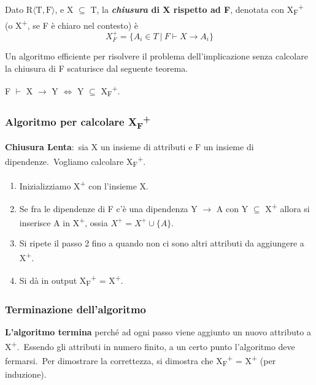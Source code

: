 \begin{definition}
	Dato $\mathrm{R\langle T,F \rangle}$, e X $\subseteq$ T, la \textbf{\textit{chiusura} di X rispetto ad F}, denotata con X\textsubscript{F}\textsuperscript{+} (o X\textsuperscript{+}, se F è chiaro nel contesto) è
	\[
		X_F^+ = \{A_i \in T\ |\ F \vdash X \rightarrow A_i\}
	\]
\end{definition}

\noindent Un algoritmo efficiente per risolvere il problema dell'implicazione senza calcolare la chiusura di F scaturisce dal seguente teorema.\

\begin{theorem}
	F $\vdash$ X $\rightarrow$ Y $\Leftrightarrow$ Y $\subseteq$ X\textsubscript{F}\textsuperscript{+}.
\end{theorem}

\subsubsection{Algoritmo per calcolare X\textsubscript{F}\textsuperscript{+}}

\textbf{Chiusura Lenta}:\ sia X un insieme di attributi e F un insieme di dipendenze.\
Vogliamo calcolare X\textsubscript{F}\textsuperscript{+}.
\begin{enumerate}
	\item Inizializziamo X\textsuperscript{+} con l'insieme X.
	\item Se fra le dipendenze di F c'è una dipendenza Y $\rightarrow$ A con Y $\subseteq$ X\textsuperscript{+} allora si inserisce A in X\textsuperscript{+}, ossia $X^+ = X^+ \cup \{A\}$.
	\item Si ripete il passo 2 fino a quando non ci sono altri attributi da aggiungere a X\textsuperscript{+}.
	\item Si dà in output X\textsubscript{F}\textsuperscript{+} = X\textsuperscript{+}.

\end{enumerate}

\subsubsection{Terminazione dell'algoritmo}

\textbf{L'algoritmo termina} perché ad ogni passo viene aggiunto un nuovo attributo a X\textsuperscript{+}.\
Essendo gli attributi in numero finito, a un certo punto l'algoritmo deve fermarsi.\
Per dimostrare la correttezza, si dimostra che X\textsubscript{F}\textsuperscript{+} = X\textsuperscript{+} (per induzione).\

